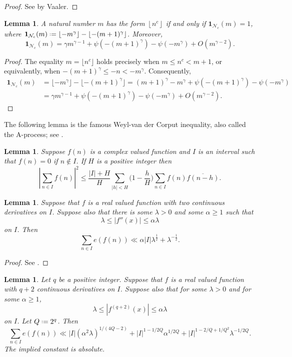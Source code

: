 \documentclass[12pt, reqno, twoside, letterpaper]{amsart}
\numberwithin{equation}{section}
\def\fl#1{\left\lfloor#1\right\rfloor}
\newcommand{\cN}{\ensuremath{\mathcal{N}}}
\theoremstyle{customthm}
\newtheorem{lemma}[X]{Lemma}
\theoremstyle{customrem}
\renewcommand{\le}{\ensuremath{\leqslant}}
\def\fl#1{\left\lfloor#1\right\rfloor}
\newcommand*{\defeq}{\mathrel{\vcenter{\baselineskip0.5ex \lineskiplimit0pt
			\hbox{\scriptsize.}\hbox{\scriptsize.}}}%
	=}
\begin{document}
	\begin{proof}
		See \cite{Vaal} by Vaaler.
	\end{proof}
	
	\begin{lemma}
		\label{lem:PS}
		A natural number $m$ has the form $\fl{n^c}$ if and only if $\mathbf{1}_{\cN_c}(m) = 1$, where
		$\mathbf{1}_{\cN_c}(m) \defeq \fl{-m^\gamma} - \fl{-(m+1)^\gamma}$.  Moreover,
		$$
		\mathbf{1}_{\cN_c}(m)=\gamma m^{\gamma-1}+ \psi(-(m+1)^\gamma) - \psi(-m^\gamma)+O(m^{\gamma-2}).
		$$
	\end{lemma}
	
	\begin{proof}
		The equality $m = \lfloor n^c \rfloor$ holds precisely when $m \leqslant n^c < m + 1$, or equivalently, when $-(m + 1)^\gamma \leqslant -n < -m^\gamma$. Consequently,
		\begin{align*}
			\mathbf{1}_{\cN_c}(m) &=\lfloor -m^\gamma \rfloor - \lfloor -(m + 1)^\gamma \rfloor=(m + 1)^\gamma - m^\gamma +\psi(-(m + 1)^\gamma) - \psi(-m^\gamma) \\
			&=\gamma m^{\gamma-1}+ \psi(-(m+1)^\gamma) - \psi(-m^\gamma)+O(m^{\gamma-2}).
		\end{align*}
	\end{proof}
The following lemma is the famous Weyl-van der Corput inequality, also called the A-process; see \cite[Lemma 2.5]{GraKol}. 
    \begin{lemma}
		\label{lem:A}
		Suppose $f(n)$ is a complex valued function and $I$ is an interval such that $f(n) = 0$ if $n \notin I$. If $H$ is a positive integer then
		$$
		|\sum_{n \in I} f(n)|^2 \le \frac{|I| + H}{H} \sum_{|h|< H} \big(1 - \frac{h}{H} \big) \sum_{n \in I} f(n) \overline{f(n-h)}.  
		$$
	\end{lemma}
	
	\begin{lemma}\label{lem:2-drivative}
Suppose that $ f $ is a real valued function with two continuous derivatives on $ I $. Suppose also that there is some $ \lambda > 0 $ and some $ \alpha \geqslant 1 $ such that  
$$
\lambda \leqslant |f''(x)| \leqslant \alpha\lambda
$$ 
on $ I $. Then  
$$
\sum_{n \in I} e(f(n)) \ll \alpha |I|\lambda^{\frac{1}{2}} + \lambda^{-\frac{1}{2}}.
$$
	\end{lemma}
	
	\begin{proof}
		See \cite[Theorem~2.2]{GraKol}.
	\end{proof}
	
	\begin{lemma}\label{lem:high-drivative}
Let $ q $ be a positive integer. Suppose that $ f $ is a real valued function with $ q + 2 $ continuous derivatives on $ I $. Suppose also that for some $ \lambda > 0 $ and for some $ \alpha \geqslant 1 $,
$$
\lambda \leqslant \left| f^{(q+2)}(x) \right| \leqslant \alpha\lambda
$$
on $ I $. Let $ Q \defeq 2^q $. Then
$$
\sum_{n \in I} e(f(n)) \ll |I|(\alpha^2\lambda)^{1/(4Q-2)} + |I|^{1-1/2Q}\alpha^{1/2Q} + |I|^{1-2/Q+1/Q^2}\lambda^{-1/2Q}.
$$
The implied constant is absolute.
	\end{lemma}
	
\end{document}
